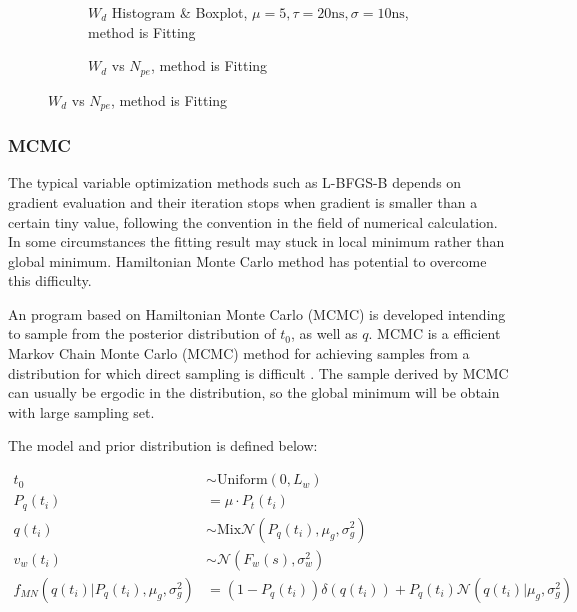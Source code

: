 \begin{figure}[H]
\begin{minipage}[t]{.5\textwidth}
\begin{figure}[H]
    \centering
    \resizebox{\textwidth}{!}{}
    \caption{\label{fig:fitting-hist} $W_{d}$ Histogram \& Boxplot, $\mu=5, \tau=20\mathrm{ns}, \sigma=10\mathrm{ns}$, method is Fitting}
\end{figure}
\end{minipage}
\begin{minipage}[t]{.5\textwidth}
\begin{figure}[H]
    \centering
    \resizebox{\textwidth}{!}{}
    \caption{\label{fig:fitting-npe} $W_{d}$ vs $N_{pe}$, method is Fitting}
\end{figure}
\end{minipage}
\end{figure}

\subsubsection{MCMC}

The typical variable optimization methods such as L-BFGS-B depends on gradient evaluation and their iteration stops when gradient is smaller than a certain tiny value, following the convention in the field of numerical calculation. In some circumstances the fitting result may stuck in local minimum rather than global minimum. Hamiltonian Monte Carlo method has potential to overcome this difficulty. 

An program based on Hamiltonian Monte Carlo (MCMC) is developed intending to sample from the posterior distribution of $t_{0}$, as well as $q$. MCMC is a efficient Markov Chain Monte Carlo (MCMC) method for achieving samples from a distribution for which direct sampling is difficult \cite{neal_mcmc_2012}. The sample derived by MCMC can usually be ergodic in the distribution, so the global minimum will be obtain with large sampling set. 

The model and prior distribution is defined below: 

\begin{align}
    t_{0} &\sim \mathrm{Uniform}(0, L_{w}) \\
    P_{q}(t_{i}) &= \mu \cdot P_{t}(t_{i}) \\
    q(t_{i}) &\sim \mathrm{Mix}\mathcal{N}(P_{q}(t_{i}), \mu_{g}, \sigma_{g}^{2}) \\
    v_{w}(t_{i}) &\sim \mathcal{N}(F_{w}(s), \sigma_{w}^{2}) \\
    f_{MN}(q(t_{i}) | P_{q}(t_{i}), \mu_{g}, \sigma_{g}^{2}) &= (1 - P_{q}(t_{i}))\delta(q(t_{i})) + P_{q}(t_{i})\mathcal{N}(q(t_{i}) | \mu_{g}, \sigma_{g}^{2}) \label{eq:mixnormal}
\end{align}

